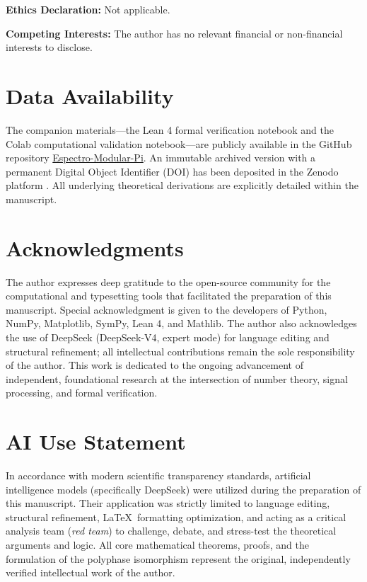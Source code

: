 \documentclass{mcom-l} %
\theoremstyle{plain} %
\theoremstyle{definition} %
\theoremstyle{remark} %
\begin{document}
\vspace{0.5em}
\noindent\textbf{Ethics Declaration:} Not applicable.

\vspace{0.5em}
\noindent\textbf{Competing Interests:} The author has no relevant financial or non-financial interests to disclose.

\section*{Data Availability}
The companion materials---the Lean 4 formal verification notebook and the Colab computational validation notebook---are publicly available in the GitHub repository \href{https://github.com/NachoPeinador/Espectro-Modular-Pi}{Espectro-Modular-Pi}. An immutable archived version with a permanent Digital Object Identifier (DOI) has been deposited in the Zenodo platform \cite{peinador_isomorphism}. All underlying theoretical derivations are explicitly detailed within the manuscript.

\section*{Acknowledgments}
The author expresses deep gratitude to the open-source community for the computational and typesetting tools that facilitated the preparation of this manuscript. Special acknowledgment is given to the developers of Python, NumPy, Matplotlib, SymPy, Lean 4, and Mathlib. The author also acknowledges the use of DeepSeek (DeepSeek-V4, expert mode) for language editing and structural refinement; all intellectual contributions remain the sole responsibility of the author. This work is dedicated to the ongoing advancement of independent, foundational research at the intersection of number theory, signal processing, and formal verification.

\section*{AI Use Statement}
In accordance with modern scientific transparency standards, artificial intelligence models (specifically DeepSeek) were utilized during the preparation of this manuscript. Their application was strictly limited to language editing, structural refinement, \LaTeX\ formatting optimization, and acting as a critical analysis team (\textit{red team}) to challenge, debate, and stress-test the theoretical arguments and logic. All core mathematical theorems, proofs, and the formulation of the polyphase isomorphism represent the original, independently verified intellectual work of the author.
\end{document}
